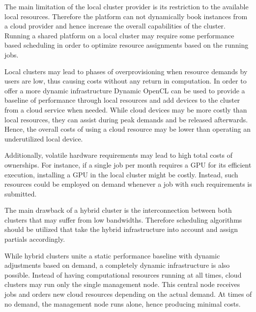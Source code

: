 \begin{description}[style=nextline]
	The main limitation of the local cluster provider is its restriction to the available local resources. Therefore the platform can not dynamically book instances from a cloud provider and hence increase the overall capabilities of the cluster. Running a shared platform on a local cluster may require some performance based scheduling in order to optimize resource assignments based on the running jobs.

	\item[Hybrid Cloud Provider]
	Local clusters may lead to phases of overprovisioning when resource demands by users are low, thus causing costs without any return in computation. In order to offer a more dynamic infrastructure Dynamic OpenCL can be used to provide a baseline of performance through local resources and add devices to the cluster from a cloud service when needed. While cloud devices may be more costly than local resources, they can assist during peak demands and be released afterwards. Hence, the overall costs of using a cloud resource may be lower than operating an underutilized local device.

	Additionally, volatile hardware requirements may lead to high total costs of ownerships. For instance, if a single job per month requires a GPU for its efficient execution, installing a GPU in the local cluster might be costly. Instead, such resources could be employed on demand whenever a job with such requirements is submitted.

	The main drawback of a hybrid cluster is the interconnection between both clusters that may suffer from low bandwidths. Therefore scheduling algorithms should be utilized that take the hybrid infrastructure into account and assign partials accordingly.

	\item[Cloud Cluster Provider]
	While hybrid clusters unite a static performance baseline with dynamic adjustments based on demand, a completely dynamic infrastructure is also possible. Instead of having computational resources running at all times, cloud clusters may run only the single management node. This central node receives jobs and orders new cloud resources depending on the actual demand. At times of no demand, the management node runs alone, hence producing minimal costs.


\end{description}
